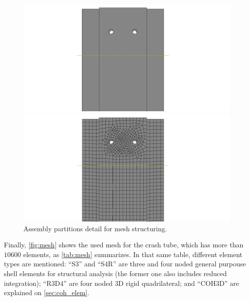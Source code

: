 \documentclass[
documentsize = a4, %
font = cmr, %
typesize = 11, %
printmode = true,
onehalfspacing = true,
language = en, %
titlepage = udciccp, %
degree = pt, %
dedication = true,
acknowledgements = true,
abstract-en = true,
abstract-es = false,
abstract-ga = false,
epigraphs = true,
toc = true,
lof = true,
lot = true,
frontmatterintoc = false,
notation = false,
minimal = false,
]{UDCthesis}
\begin{document}
\begin{figure}
	\centering
	\begin{minipage}[b]{.48\linewidth}
		\centering
		\includegraphics[width=\linewidth]{IMG_CUTRES/assembly_detail_holes}
	\end{minipage}
	\quad
	\begin{minipage}[b]{.48\linewidth}
		\centering
		\includegraphics[width=\linewidth]{IMG_CUTRES/mesh_detail_holes}
	\end{minipage}
\caption{Assembly partitions detail for mesh structuring.}
\label{fig:mesh_part}
\end{figure}

Finally, \cref{fig:mesh} shows the used mesh for the crash tube, which has more than $\num{10600}$ elements, as \cref{tab:mesh} summarizes. In that same table, different element types are mentioned: ``S3'' and ``S4R'' are three and four noded general purpouse shell elements for structural analysis (the former one also includes reduced integration); ``R3D4'' are four noded 3D rigid quadrilateral; and ``COH3D'' are explained on \cref{sec:coh_elem}.
\end{document}
